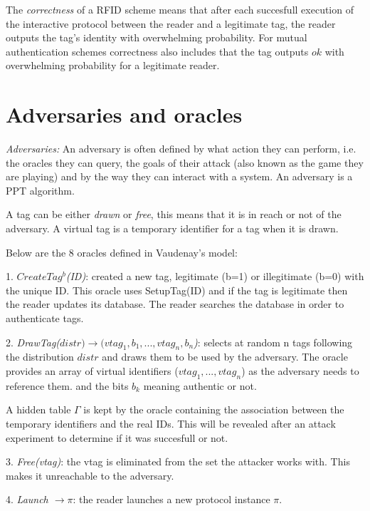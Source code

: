     The \textit{correctness} of a RFID scheme means that after each succesfull execution of the interactive protocol between the reader and a 
    legitimate tag, the reader outputs the tag's identity with overwhelming probability. For mutual authentication schemes correctness also includes
    that the tag outputs $ok$ with overwhelming probability for a legitimate reader.

\section{Adversaries and oracles}

    \textit{Adversaries:} An adversary is often defined by what action they can perform, i.e. the oracles they can query, 
    the goals of their attack (also known as the game they are playing) and by the way they can interact with a system. An adversary
    is a PPT algorithm.
    
    A tag can be either \textit{drawn} or \textit{free}, this means that it is in reach or not of the 
    adversary. A virtual tag is a temporary identifier for a tag when it is drawn.

    Below are the 8 oracles defined in Vaudenay's model:

    1. \textit{$CreateTag^b$(ID)}: created a new tag, legitimate (b=1) or illegitimate (b=0) with the unique ID.
        This oracle uses SetupTag(ID) and if the tag is legitimate then the reader 
        updates its database. The reader searches the database in order to authenticate tags.
    
    2. \textit{DrawTag($distr) \rightarrow (vtag_1, b_1, ... , vtag_n, b_n$)}: selects at random n tags following the 
    distribution $distr$ and draws them to be used by the adversary. The oracle provides
    an array of virtual identifiers ($vtag_1, ... ,vtag_n$) as the adversary needs to reference them.
    and the bits $b_k$ meaning authentic or not. 
    
    A hidden table $\Gamma$ is kept by the oracle containing the association between the temporary identifiers and the real IDs.
    This will be revealed after an attack experiment to determine if it was succesfull or not.

    3. \textit{Free(vtag)}: the vtag is eliminated from the set the attacker works with. This makes it unreachable to the adversary.
    
    4. \textit{Launch $\rightarrow \pi$}: the reader launches a new protocol instance $\pi$.

